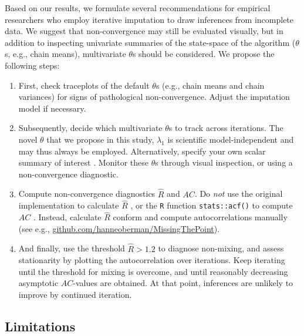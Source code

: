 \documentclass[Royal,times,sageh]{sagej}
\begin{document}
Based on our results, we formulate several recommendations for empirical researchers who employ iterative imputation to draw inferences from incomplete data. We suggest that non-convergence may still be evaluated visually, but in addition to inspecting univariate summaries of the state-space of the algorithm (\(\theta\)s, e.g., chain means), multivariate \(\theta\)s should be considered. We propose the following steps:

\begin{enumerate}
\def\labelenumi{\arabic{enumi}.}
\item
  First, check traceplots of the default \(\theta\)s (e.g., chain means and chain variances) for signs of pathological non-convergence. Adjust the imputation model if necessary.
\item
  Subsequently, decide which multivariate \(\theta\)s to track across iterations. The novel \(\theta\) that we propose in this study, \(\lambda_1\) is scientific model-independent and may thus always be employed. Alternatively, specify your own scalar summary of interest \citep[see e.g.,][]{buur18}. Monitor these \(\theta\)s through visual inspection, or using a non-convergence diagnostic.
\item
  Compute non-convergence diagnostics \(\widehat{R}\) and \(AC\). Do \emph{not} use the original implementation to calculate \(\widehat{R}\) \citep{gelm92}, or the \texttt{R} function \texttt{stats::acf()} to compute \(AC\) \citep{R}. Instead, calculate \(\widehat{R}\) conform \citet{veht19} and compute autocorrelations manually (see e.g., \href{https://github.com/hanneoberman/MissingThePoint}{github.com/hanneoberman/MissingThePoint}).
\item
  And finally, use the threshold \(\widehat{R}>1.2\) to diagnose non-mixing, and assess stationarity by plotting the autocorrelation over iterations. Keep iterating until the threshold for mixing is overcome, and until reasonably decreasing asymptotic \(AC\)-values are obtained. At that point, inferences are unlikely to improve by continued iteration.
\end{enumerate}

\hypertarget{limitations}{%
\subsection{Limitations}\label{limitations}}
\end{document}
